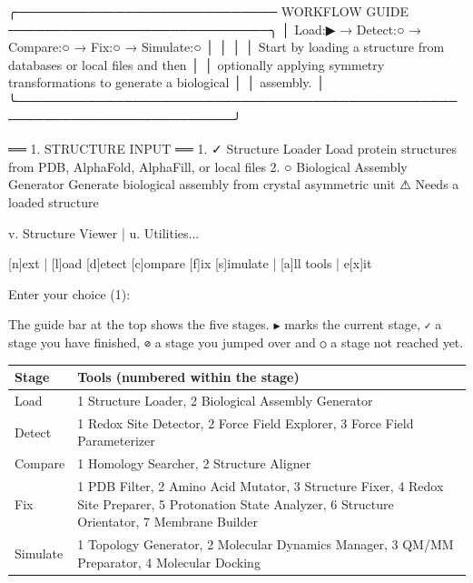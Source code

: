 \begin{screen}
╭───────────────────────────── WORKFLOW GUIDE ─────────────────────────────╮
│ Load:▶ → Detect:○ → Compare:○ → Fix:○ → Simulate:○                       │
│                                                                          │
│ Start by loading a structure from databases or local files and then      │
│ optionally applying symmetry transformations to generate a biological    │
│ assembly.                                                                │
╰──────────────────────────────────────────────────────────────────────────╯

══ 1. STRUCTURE INPUT ══
  1. ✓ Structure Loader
       Load protein structures from PDB, AlphaFold, AlphaFill, or local files
  2. ○ Biological Assembly Generator
       Generate biological assembly from crystal asymmetric unit
       ⚠ Needs a loaded structure

  v. Structure Viewer  |  u. Utilities...

[n]ext | [l]oad [d]etect [c]ompare [f]ix [s]imulate | [a]ll tools | e[x]it

Enter your choice (1):
\end{screen}

The guide bar at the top shows the five stages. \texttt{▶} marks the current
stage, \texttt{✓} a stage you have finished, \texttt{⊘} a stage you jumped over
and \texttt{○} a stage not reached yet.

\begin{tabularx}{\linewidth}{@{}lL@{}}
\toprule
\textbf{Stage} & \textbf{Tools (numbered within the stage)} \\
\midrule
Load & 1 Structure Loader, 2 Biological Assembly Generator \\
Detect & 1 Redox Site Detector, 2 Force Field Explorer, 3 Force Field
Parameterizer \\
Compare & 1 Homology Searcher, 2 Structure Aligner \\
Fix & 1 PDB Filter, 2 Amino Acid Mutator, 3 Structure Fixer, 4 Redox Site
Preparer, 5 Protonation State Analyzer, 6 Structure Orientator, 7 Membrane
Builder \\
Simulate & 1 Topology Generator, 2 Molecular Dynamics Manager, 3 QM/MM
Preparator, 4 Molecular Docking \\
\bottomrule
\end{tabularx}

